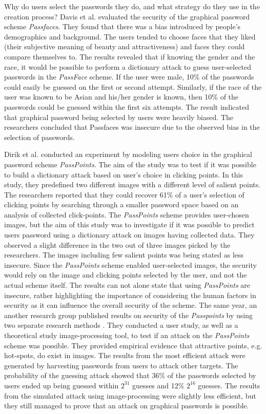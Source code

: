     Why do users select the passwords they do, and what strategy do they use in the creation process? Davis et al.\cite{Davis} evaluated the security of the graphical password scheme {\it Passfaces}. They found that there was a bias introduced by people's demographics and background. The users tended to choose faces that they liked (their subjective meaning of beauty and attractiveness) and faces they could compare themselves to. The results revealed that if knowing the gender and the race, it would be possible to perform a dictionary attack to guess user-selected passwords in the {\it PassFace} scheme. If the user were male, 10\% of the passwords could easily be guessed on the first or second attempt. Similarly, if the race of the user was known to be Asian and his/her gender is known, then 10\% of the passwords could be guessed within the first six attempts. The result indicated that graphical password being selected by users were heavily biased. The researchers concluded that Passfaces was insecure due to the observed bias in the selection of passwords. 

    Dirik et al. \cite{Dirik} conducted an experiment by modeling users choice in the graphical password scheme {\it PassPoints}. The aim of the study was to test if it was possible to build a dictionary attack based on user's choice in clicking points. In this study, they predefined two different images with a different level of salient points. The researchers reported that they could recover 61\% of a user's selection of clicking points by searching through a smaller password space based on an analysis of collected click-points. The {\it PassPoints} scheme provides user-chosen images, but the aim of this study was to investigate if it was possible to predict users password using a dictionary attack on images having collected data. They observed a slight difference in the two out of three images picked by the researchers. The images including few salient points was being stated as less insecure. Since the {\it PassPoints} scheme enabled user-selected images, the security would rely on the image and clicking points selected by the user, and not the actual scheme itself. The results can not alone state that using {\it PassPoints} are insecure, rather highlighting the importance of considering the human factors in security as it can influence the overall security of the scheme. The same year, an another research group published results on security of the {\it Passpoints} by using two separate research methods  \cite{Thorpe2}. They conducted a user study, as well as a theoretical study image-processing tool, to test if an attack on the {\it PassPoints} scheme was possible. They provided empirical evidence that attractive points, e.g. hot-spots, do exist in images. The results from the most efficient attack were generated by harvesting passwords from users to attack other targets. The probability of the guessing attack showed that 36\% of the passwords selected by users ended up being guessed within $2^{31}$ guesses and 12\% $2^{16}$ guesses. The results from the simulated attack using image-processing were slightly less efficient, but they still managed to prove that an attack on graphical passwords is possible.
    
